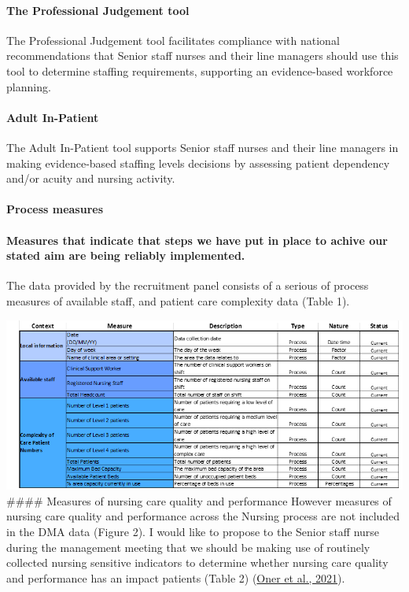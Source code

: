 \documentclass[
]{article}
\begin{document}
\hypertarget{the-professional-judgement-tool}{%
\paragraph{The Professional Judgement
tool}\label{the-professional-judgement-tool}}

The Professional Judgement tool facilitates compliance with national
recommendations that Senior staff nurses and their line managers should
use this tool to determine staffing requirements, supporting an
evidence-based workforce planning.

\hypertarget{adult-in-patient}{%
\paragraph{Adult In-Patient}\label{adult-in-patient}}

The Adult In-Patient tool supports Senior staff nurses and their line
managers in making evidence‐based staffing levels decisions by assessing
patient dependency and/or acuity and nursing activity.

\hypertarget{process-measures}{%
\paragraph{Process measures}\label{process-measures}}

\hypertarget{measures-that-indicate-that-steps-we-have-put-in-place-to-achive-our-stated-aim-are-being-reliably-implemented.}{%
\paragraph{Measures that indicate that steps we have put in place to
achive our stated aim are being reliably
implemented.}\label{measures-that-indicate-that-steps-we-have-put-in-place-to-achive-our-stated-aim-are-being-reliably-implemented.}}

The data provided by the recruitment panel consists of a serious of
process measures of available staff, and patient care complexity data
(Table 1).

\includegraphics{./../../Output/Visuals/DataDictionary.png} \#\#\#\#
Measures of nursing care quality and performance However measures of
nursing care quality and performance across the Nursing process are not
included in the DMA data (Figure 2). I would like to propose to the
Senior staff nurse during the management meeting that we should be
making use of routinely collected nursing sensitive indicators to
determine whether nursing care quality and performance has an impact
patients (Table 2)
(\protect\hyperlink{ref-oner2021NursingSensitiveIndicators}{Oner et al.,
2021}).
\end{document}

